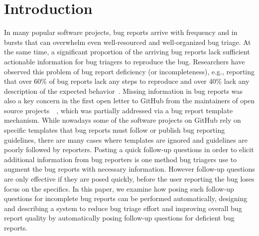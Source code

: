 \section{Introduction}

In many popular software projects, bug reports arrive with frequency and in bursts that can overwhelm even well-resourced and well-organized bug triage.
%
At the same time, a significant proportion of the arriving bug reports lack sufficient actionable information for bug triagers to reproduce the bug.
%
Researchers have observed this problem of bug report deficiency (or incompleteness), e.g., reporting that over 60\% of bug reports lack any steps to reproduce and over 40\% lack any description of the expected behavior~\cite{chaparro17detecting}.
%
Missing information in bug reports was also a key concern in the first open letter to GitHub from the maintainers of open source projects~\cite{deargithub}~\cite{breu2010information}, which was partially addressed via a bug report template mechanism.
%
While nowadays some of the software projects on GitHub rely on specific templates that bug reports must follow or publish bug reporting guidelines, there are many cases where templates are ignored and guidelines are poorly followed by reporters.
%
Posting a quick follow-up questions in order to elicit additional information from bug reporters is one method bug triagers use to augment the bug reports with necessary information.
%
However follow-up questions are only effective if they are posed quickly, before the user reporting the bug loses focus on the specifics.
%
In this paper, we examine how posing such follow-up questions for incomplete bug reports can be performed automatically, designing and describing a system to reduce bug triage effort and improving overall bug report quality by automatically posing follow-up questions for deficient bug reports.

